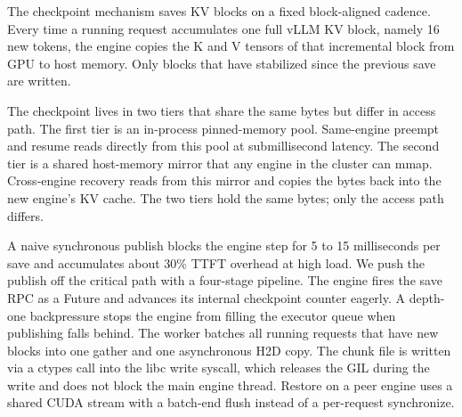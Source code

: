 
The checkpoint mechanism saves KV blocks on a fixed block-aligned cadence. Every time a running request accumulates one full vLLM KV block, namely 16 new tokens, the engine copies the K and V tensors of that incremental block from GPU to host memory. Only blocks that have stabilized since the previous save are written. 


The checkpoint lives in two tiers that share the same bytes but differ in access path. The first tier is an in-process pinned-memory pool. Same-engine preempt and resume reads directly from this pool at submillisecond latency. The second tier is a shared host-memory mirror that any engine in the cluster can mmap. Cross-engine recovery reads from this mirror and copies the bytes back into the new engine's KV cache. The two tiers hold the same bytes; only the access path differs.


A naive synchronous publish blocks the engine step for 5 to 15 milliseconds per save and accumulates about 30\% TTFT overhead at high load. We push the publish off the critical path with a four-stage pipeline. The engine fires the save RPC as a Future and advances its internal checkpoint counter eagerly. A depth-one backpressure stops the engine from filling the executor queue when publishing falls behind. The worker batches all running requests that have new blocks into one gather and one asynchronous H2D copy. The chunk file is written via a ctypes call into the libc write syscall, which releases the GIL during the write and does not block the main engine thread. Restore on a peer engine uses a shared CUDA stream with a batch-end flush instead of a per-request synchronize.

